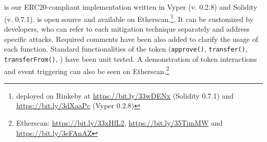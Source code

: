 

\section{\sys}\label{sec:proposal}
\sys is our ERC20-compliant implementation written in Vyper (v. 0.2.8) and Solidity (v. 0.7.1). \sys is open source and available on Etherscan.\footnote{\sys deployed on Rinkeby at \url{https://bit.ly/33wDENx} (Solidity 0.7.1) and \url{https://bit.ly/3dXaaPc} (Vyper 0.2.8)}. It can be customized by developers, who can refer to each mitigation technique separately and address specific attacks. Required comments have been also added to clarify the usage of each function. Standard functionalities of the token (\ie \texttt{approve()}, \texttt{transfer()}, \texttt{transferFrom()}, \etc) have been unit tested. A demonstration of token interactions and event triggering can also be seen on Etherscan.\footnote{Etherscan: \url{https://bit.ly/33xHfL2}, \url{https://bit.ly/35TimMW} and \url{https://bit.ly/3eFAnAZ}}





